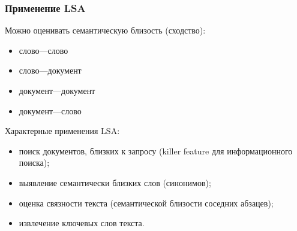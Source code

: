 \documentclass[10pt,svgnames]{beamer}
\begin{document}
\begin{frame}
  \frametitle{Применение LSA}
  Можно оценивать семантическую близость (сходство):
  \begin{itemize}
  \item слово—слово
  \item слово—документ
  \item документ—документ
  \item документ—слово
  \end{itemize}
  Характерные применения LSA:
  \begin{itemize}
  \item поиск документов, близких к запросу (killer feature для
    информационного поиска);
  \item выявление семантически близких слов (синонимов);
  \item оценка связности текста (семантической близости соседних абзацев);
  \item извлечение ключевых слов текста.
  \end{itemize}
\end{frame}
\end{document}
